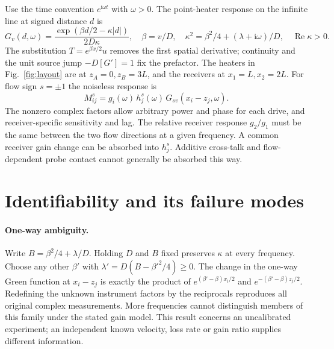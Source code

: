 \documentclass[11pt]{article}
\newcommand{\ii}{\mathrm i}
\begin{document}
Use the time convention $e^{\ii\omega t}$ with $\omega>0$. The point-heater response on the infinite line at signed distance $d$ is
\begin{equation}
 G_v(d,\omega)=\frac{\exp(\beta d/2-\kappa |d|)}{2D\kappa},
 \quad \beta=v/D,\quad \kappa^2=\beta^2/4+(\lambda+\ii\omega)/D,\quad
 \operatorname{Re}\kappa>0 . \label{eq:green}
\end{equation}
The substitution $T=e^{\beta x/2}u$ removes the first spatial derivative; continuity and the unit source jump $-D[G']=1$ fix the prefactor. The heaters in Fig.~\ref{fig:layout} are at $z_A=0,z_B=3L$, and the receivers at $x_1=L,x_2=2L$. For flow sign $s=\pm1$ the noiseless response is
\[
 M_{ij}^{s}=g_i(\omega)\,h_j^s(\omega)\,G_{sv}(x_i-z_j,\omega).
\]
The nonzero complex factors allow arbitrary power and phase for each drive, and receiver-specific sensitivity and lag. The relative receiver response $g_2/g_1$ must be the same between the two flow directions at a given frequency. A common receiver gain change can be absorbed into $h_j^s$. Additive cross-talk and flow-dependent probe contact cannot generally be absorbed this way.

\section{Identifiability and its failure modes}
\paragraph{One-way ambiguity.}
Write $B=\beta^2/4+\lambda/D$. Holding $D$ and $B$ fixed preserves $\kappa$ at every frequency. Choose any other $\beta'$ with $\lambda'=D(B-\beta'^2/4)\ge0$. The change in the one-way Green function at $x_i-z_j$ is exactly the product of $e^{(\beta'-\beta)x_i/2}$ and $e^{-(\beta'-\beta)z_j/2}$. Redefining the unknown instrument factors by the reciprocals reproduces all original complex measurements. More frequencies cannot distinguish members of this family under the stated gain model. This result concerns an uncalibrated experiment; an independent known velocity, loss rate or gain ratio supplies different information.
\end{document}
